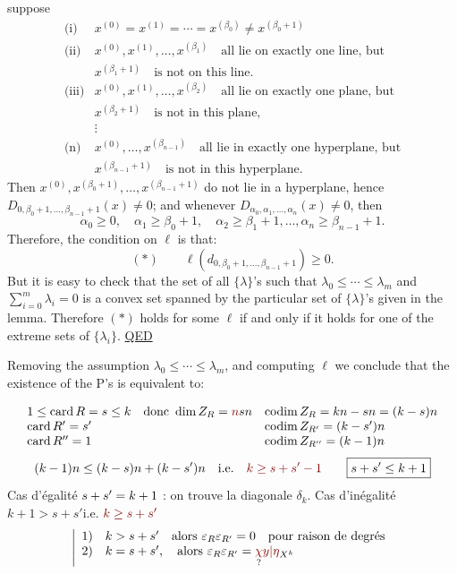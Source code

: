 suppose
\[
\begin{array}{rl}
\text{(i)}&x^{(0)}=x^{(1)}=\cdots=x^{(\beta_0)}\ne x^{(\beta_0+1)}\\[5pt]
\text{(ii)}&x^{(0)},x^{(1)},\ldots,x^{(\beta_1)}
\quad\text{all lie on exactly one line, but}\\
&x^{(\beta_1+1)}\quad\text{is not on this line.}\\[5pt]
\text{(iii)}&x^{(0)},x^{(1)},\ldots,x^{(\beta_2)}
\quad\text{all lie on exactly one plane, but}\\
&x^{(\beta_2+1)}\quad\text{is not in this plane,}\\
&\vdots\\
\text{(n)}&x^{(0)},\ldots,x^{(\beta_{n-1})}
\quad\text{all lie in exactly one hyperplane, but}\\
&x^{(\beta_{n-1}+1)}\quad\text{is not in this hyperplane.}
\end{array}
\]
Then $x^{(0)},x^{(\beta_0+1)},\ldots,x^{(\beta_{n-1}+1)}$
do not lie in a hyperplane, hence
$D_{0,\beta_0+1,\ldots,\beta_{n-1}+1}(x)\ne0$;
and whenever $D_{\alpha_0,\alpha_1,\ldots,\alpha_n}(x)\ne0$, then
\[
\alpha_0\ge0,\quad\alpha_1\ge\beta_0+1,\quad
\alpha_2\ge\beta_1+1,\ldots,\alpha_n\ge\beta_{n-1}+1.
\]
Therefore, the condition on $\ell$ is that:
\[
(*)\qquad\ell(d_{0,\beta_0+1,\ldots,\beta_{n-1}+1})\ge0.
\]
But it is easy to check that the set of all $\{\lambda\}$'s such that
$\lambda_0\le\cdots\le\lambda_m$
and $\displaystyle\sum_{i=0}^m\lambda_i=0$ is a convex set spanned by the particular set of
$\{\lambda\}$'s given in the lemma. Therefore $(*)$ holds for some $\ell$ if and only
if it holds for one of the extreme sets of $\{\lambda_i\}$.
\uline{QED}

Removing the assumption $\lambda_0\le\cdots\le\lambda_m$, and computing $\ell$ we
conclude that the existence of the P's is equivalent to:

\[
\begin{array}{lll}
1\le\operatorname{card}R=s\le k&
\text{donc }\dim Z_R=\deleted{\unsure{n}}sn&
\operatorname{codim}Z_R=kn-sn=(k-s)n\\
\operatorname{card}R'=s'&&\operatorname{codim}Z_{R'}=(k-s')n\\
\operatorname{card}R''=1&&\operatorname{codim}Z_{R''}=(k-1)n
\end{array}
\]
\[
(k-1)n\le(k-s)n+(k-s')n
\quad\text{i.e.}\quad\deleted{\unsure{k\ge s+s'-1}}
\qquad\boxed{s+s'\le k+1}
\]
Cas d'égalité $s+s'=k+1$ : on trouve la diagonale $\delta_k$.
Cas d'inégalité\quad
$k+1>s+s'$\quad i.e. $\unsure{k\ge s+s'}$
\[
\left|\begin{array}{ll}
1)&k>s+s'\quad\text{alors }\varepsilon_R\varepsilon_{R'}=0
\quad\text{pour raison de degrés}\\
2)&k=s+s',\quad\text{alors }\varepsilon_R\varepsilon_{R'}
=\underset{?}{\unsure{\chi}}\unsure{y|\eta}_{X^k}
\end{array}\right.
\]

